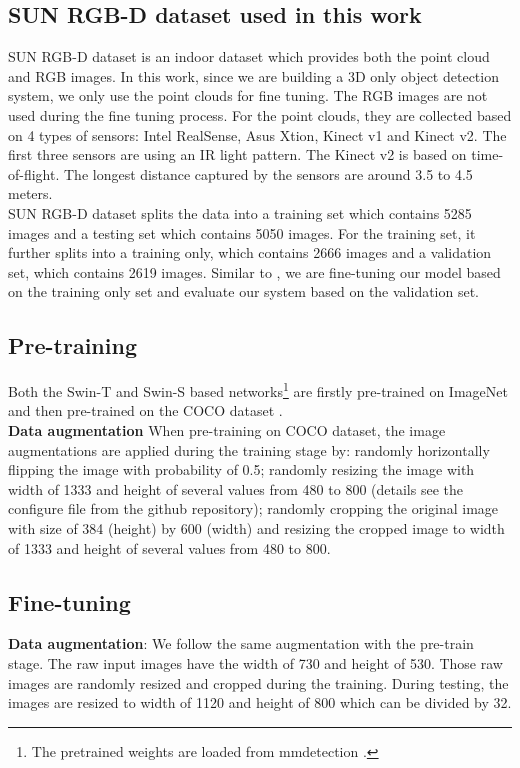 \documentclass[]{modified_llncs}
\begin{document}
\subsection{SUN RGB-D dataset used in this work}
SUN RGB-D\cite{Song_2015_CVPR} dataset is an indoor dataset which provides both the point cloud and RGB images. In this work, since we are building a 3D only object detection system, we only use the point clouds for fine tuning. The RGB images are not used during the fine tuning process. For the point clouds, they are collected based on 4 types of sensors: Intel RealSense, Asus Xtion, Kinect v1 and Kinect v2. The first three sensors are using an IR light pattern. The Kinect v2 is based on time-of-flight. The longest distance captured by the sensors are around 3.5 to 4.5 meters.\\
SUN RGB-D dataset splits the data into a training set which contains 5285 images and a testing set which contains 5050 images. For the training set, it further splits into a training only, which contains 2666 images and a validation set, which contains 2619 images. Similar to \cite{DBLP:journals/corr/SongX15,Lahoud_2017_ICCV,Shen_2020_WACV,Shen_2020_v2} , we are fine-tuning our model based on the training only set and evaluate our system based on the validation set.\\
\subsection{Pre-training}
Both the Swin-T and Swin-S based networks\footnote{The pretrained weights are loaded from mmdetection \cite{mmdetection}.} are firstly pre-trained on ImageNet \cite{deng2009imagenet} and then pre-trained on the COCO dataset \cite{DBLP:journals/corr/LinMBHPRDZ14}.\\
\textbf{Data augmentation} When pre-training on COCO dataset, the image augmentations are applied during the training stage by: randomly horizontally flipping the image with probability of 0.5; randomly resizing the image with width of 1333 and height of several values from 480 to 800 (details see the configure file from the github repository); randomly cropping the original image with size of 384 (height) by 600 (width) and resizing the cropped image to width of 1333 and height of several values from 480 to 800.\\
\subsection{Fine-tuning}
\textbf{Data augmentation}: We follow the same augmentation with the pre-train stage. The raw input images have the width of 730 and height of 530. Those raw images are randomly resized and cropped during the training. During testing, the images are resized to width of 1120 and height of 800 which can be divided by 32.
\end{document}

